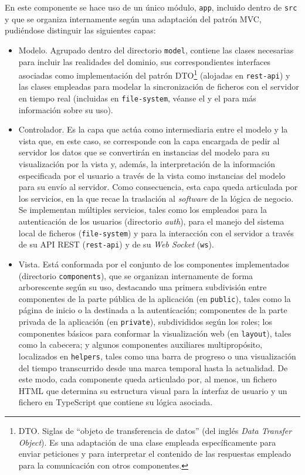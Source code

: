 En este componente se hace uso de un único módulo, \texttt{app}, incluido dentro de \texttt{src} y que se organiza internamente según una adaptación del patrón MVC, pudiéndose distinguir las siguientes capas:
\begin{itemize}
    \item Modelo. Agrupado dentro del directorio \texttt{model}, contiene las clases necesarias para incluir las realidades del dominio, sus correspondientes interfaces asociadas como implementación del patrón DTO\footnote{DTO. Siglas de ``objeto de transferencia de datos'' (del inglés \textit{Data Transfer Object}). Es una adaptación de una clase empleada específicamente para enviar peticiones y para interpretar el contenido de las respuestas empleado para la comunicación con otros componentes.} (alojadas en \texttt{rest-api}) y las clases empleadas para modelar la sincronización de ficheros con el servidor en tiempo real (incluidas en \texttt{file-system}, véanse el  y el  para más información sobre su uso).
    \item Controlador. Es la capa que actúa como intermediaria entre el modelo y la vista que, en este caso, se corresponde con la capa encargada de pedir al servidor los datos que se convertirán en instancias del modelo para su visualización por la vista y, además, la interpretación de la información especificada por el usuario a través de la vista como instancias del modelo para su envío al servidor. Como consecuencia, esta capa queda articulada por los servicios, en la que recae la traslación al \textit{software} de la lógica de negocio. Se implementan múltiples servicios, tales como los empleados para la autenticación de los usuarios (directorio \textit{auth}), para el manejo del sistema local de ficheros (\texttt{file-system}) y para la interacción con el servidor a través de su API REST (\texttt{rest-api}) y de su \textit{Web Socket} (\texttt{ws}).
    \item Vista. Está conformada por el conjunto de los componentes implementados (directorio \texttt{components}), que se organizan internamente de forma arborescente según su uso, destacando una primera subdivisión entre componentes de la parte pública de la aplicación (en \texttt{public}), tales como la página de inicio o la destinada a la autenticación; componentes de la parte privada de la aplicación (en \texttt{private}), subdivididos según los roles; los componentes básicos para conformar la visualización web (en \texttt{layout}), tales como la cabecera; y algunos componentes auxiliares multipropósito, localizados en \texttt{helpers}, tales como una barra de progreso o una visualización del tiempo transcurrido desde una marca temporal hasta la actualidad. De este modo, cada componente queda articulado por, al menos, un fichero HTML que determina su estructura visual para la interfaz de usuario y un fichero en TypeScript que contiene su lógica asociada.
\end{itemize}

